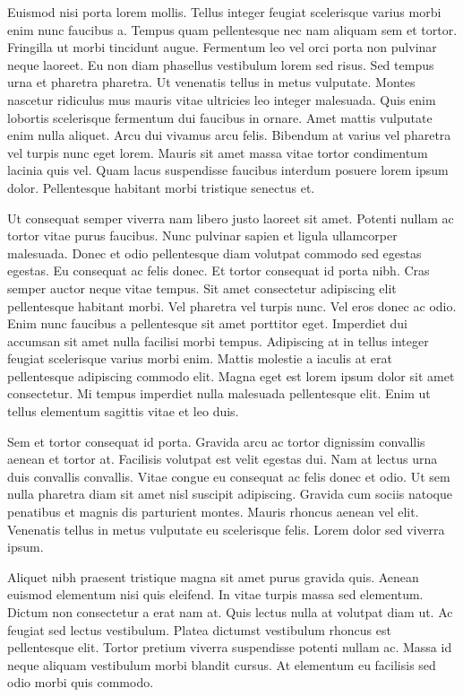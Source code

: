 \documentclass[11pt,a4paper]{article}
\begin{document}
Euismod nisi porta lorem mollis. Tellus integer feugiat scelerisque varius morbi enim nunc faucibus a. Tempus quam pellentesque nec nam aliquam sem et tortor. Fringilla ut morbi tincidunt augue. Fermentum leo vel orci porta non pulvinar neque laoreet. Eu non diam phasellus vestibulum lorem sed risus. Sed tempus urna et pharetra pharetra. Ut venenatis tellus in metus vulputate. Montes nascetur ridiculus mus mauris vitae ultricies leo integer malesuada. Quis enim lobortis scelerisque fermentum dui faucibus in ornare. Amet mattis vulputate enim nulla aliquet. Arcu dui vivamus arcu felis. Bibendum at varius vel pharetra vel turpis nunc eget lorem. Mauris sit amet massa vitae tortor condimentum lacinia quis vel. Quam lacus suspendisse faucibus interdum posuere lorem ipsum dolor. Pellentesque habitant morbi tristique senectus et.

Ut consequat semper viverra nam libero justo laoreet sit amet. Potenti nullam ac tortor vitae purus faucibus. Nunc pulvinar sapien et ligula ullamcorper malesuada. Donec et odio pellentesque diam volutpat commodo sed egestas egestas. Eu consequat ac felis donec. Et tortor consequat id porta nibh. Cras semper auctor neque vitae tempus. Sit amet consectetur adipiscing elit pellentesque habitant morbi. Vel pharetra vel turpis nunc. Vel eros donec ac odio. Enim nunc faucibus a pellentesque sit amet porttitor eget. Imperdiet dui accumsan sit amet nulla facilisi morbi tempus. Adipiscing at in tellus integer feugiat scelerisque varius morbi enim. Mattis molestie a iaculis at erat pellentesque adipiscing commodo elit. Magna eget est lorem ipsum dolor sit amet consectetur. Mi tempus imperdiet nulla malesuada pellentesque elit. Enim ut tellus elementum sagittis vitae et leo duis.

Sem et tortor consequat id porta. Gravida arcu ac tortor dignissim convallis aenean et tortor at. Facilisis volutpat est velit egestas dui. Nam at lectus urna duis convallis convallis. Vitae congue eu consequat ac felis donec et odio. Ut sem nulla pharetra diam sit amet nisl suscipit adipiscing. Gravida cum sociis natoque penatibus et magnis dis parturient montes. Mauris rhoncus aenean vel elit. Venenatis tellus in metus vulputate eu scelerisque felis. Lorem dolor sed viverra ipsum.

Aliquet nibh praesent tristique magna sit amet purus gravida quis. Aenean euismod elementum nisi quis eleifend. In vitae turpis massa sed elementum. Dictum non consectetur a erat nam at. Quis lectus nulla at volutpat diam ut. Ac feugiat sed lectus vestibulum. Platea dictumst vestibulum rhoncus est pellentesque elit. Tortor pretium viverra suspendisse potenti nullam ac. Massa id neque aliquam vestibulum morbi blandit cursus. At elementum eu facilisis sed odio morbi quis commodo.
\end{document}

